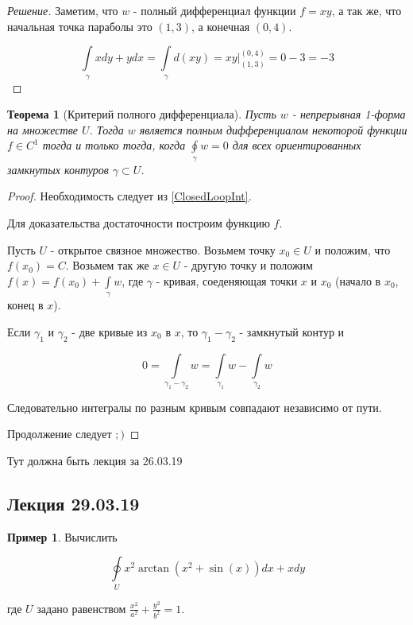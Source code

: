 \documentclass[a5paper]{article}
\newcounter{through}
\theoremstyle{plain}
\newtheorem{theorem}[through]{Теорема}
\theoremstyle{definition}
\newtheorem{example}[through]{Пример}
\numberwithin{through}{section}
\numberwithin{equation}{section}
\begin{document}
\begin{proof}[Решение]
	Заметим, что $w$ - полный дифференциал функции $f=xy$, а так же, что начальная точка параболы это $(1, 3)$, а конечная $(0, 4)$.
	
	\begin{equation*}
		\int\limits_{\gamma} xdy + ydx = \int\limits_{\gamma} d(xy) = xy \bigg|_{(1, 3)}^{(0, 4)} = 0 - 3 = -3
	\end{equation*}
\end{proof}

\begin{theorem}[Критерий полного дифференциала]
	Пусть $w$ - непрерывная 1-форма на множестве $U$. Тогда $w$ является полным дифференциалом некоторой функции $f \in C^1$ тогда и только тогда, когда $\oint\limits_{\gamma} w = 0$ для всех ориентированных замкнутых контуров $\gamma \subset U$.
\end{theorem}

\begin{proof}
	Необходимость следует из \ref{ClosedLoopInt}.
	
	Для доказательства достаточности построим функцию $f$. 
	
	Пусть $U$ - открытое связное множество. Возьмем точку $x_0 \in U$ и положим, что $f(x_0)=C$. Возьмем так же $x \in U$ - другую точку и положим $f(x)=f(x_0)+\int\limits_{\gamma} w$, где $\gamma$ - кривая, соеденяющая точки $x$ и $x_0$ (начало в $x_0$, конец в $x$). 
	
	Если $\gamma_1$ и $\gamma_2$ - две кривые из $x_0$ в $x$, то $\gamma_1 - \gamma_2$ - замкнутый контур и 
	
	\begin{equation*}
		0 = \int\limits_{\gamma_1 - \gamma_2}w = \int\limits_{\gamma_1} w - \int\limits_{\gamma_2} w
	\end{equation*}
	
	Следовательно интегралы по разным кривым совпадают независимо от пути.
	
	Продолжение следует $;)$
\end{proof}

Тут должна быть лекция за 26.03.19 %

\subsection{Лекция 29.03.19} %

\begin{example}
	Вычислить
	
	\begin{equation*}
		\oint\limits_{U} x^2 \arctan(x^2+\sin(x))dx + xdy
	\end{equation*}
	
	где $U$ задано равенством $\frac{x^2}{a^2} + \frac{y^2}{b^2} = 1$.
\end{example}
\end{document}
